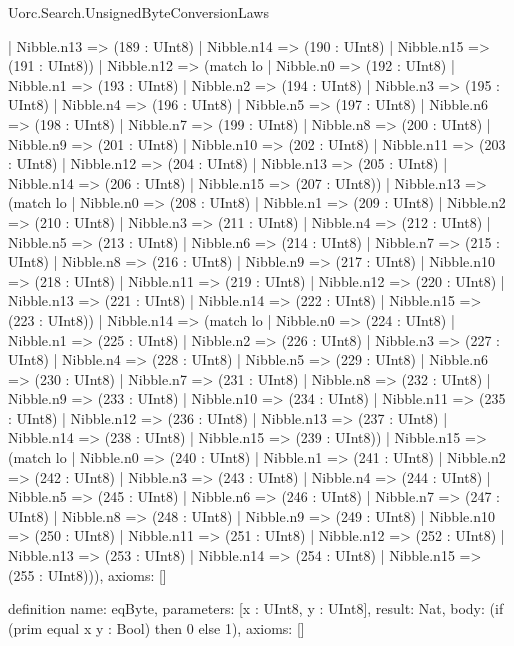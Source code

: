 \begin{lexlean}{Uorc.Search.UnsignedByteConversionLaws}
\begin{semanticmodule}
{      | Nibble.n13 => (189 : UInt8)
      | Nibble.n14 => (190 : UInt8)
      | Nibble.n15 => (191 : UInt8))
    | Nibble.n12 => (match lo
      | Nibble.n0 => (192 : UInt8)
      | Nibble.n1 => (193 : UInt8)
      | Nibble.n2 => (194 : UInt8)
      | Nibble.n3 => (195 : UInt8)
      | Nibble.n4 => (196 : UInt8)
      | Nibble.n5 => (197 : UInt8)
      | Nibble.n6 => (198 : UInt8)
      | Nibble.n7 => (199 : UInt8)
      | Nibble.n8 => (200 : UInt8)
      | Nibble.n9 => (201 : UInt8)
      | Nibble.n10 => (202 : UInt8)
      | Nibble.n11 => (203 : UInt8)
      | Nibble.n12 => (204 : UInt8)
      | Nibble.n13 => (205 : UInt8)
      | Nibble.n14 => (206 : UInt8)
      | Nibble.n15 => (207 : UInt8))
    | Nibble.n13 => (match lo
      | Nibble.n0 => (208 : UInt8)
      | Nibble.n1 => (209 : UInt8)
      | Nibble.n2 => (210 : UInt8)
      | Nibble.n3 => (211 : UInt8)
      | Nibble.n4 => (212 : UInt8)
      | Nibble.n5 => (213 : UInt8)
      | Nibble.n6 => (214 : UInt8)
      | Nibble.n7 => (215 : UInt8)
      | Nibble.n8 => (216 : UInt8)
      | Nibble.n9 => (217 : UInt8)
      | Nibble.n10 => (218 : UInt8)
      | Nibble.n11 => (219 : UInt8)
      | Nibble.n12 => (220 : UInt8)
      | Nibble.n13 => (221 : UInt8)
      | Nibble.n14 => (222 : UInt8)
      | Nibble.n15 => (223 : UInt8))
    | Nibble.n14 => (match lo
      | Nibble.n0 => (224 : UInt8)
      | Nibble.n1 => (225 : UInt8)
      | Nibble.n2 => (226 : UInt8)
      | Nibble.n3 => (227 : UInt8)
      | Nibble.n4 => (228 : UInt8)
      | Nibble.n5 => (229 : UInt8)
      | Nibble.n6 => (230 : UInt8)
      | Nibble.n7 => (231 : UInt8)
      | Nibble.n8 => (232 : UInt8)
      | Nibble.n9 => (233 : UInt8)
      | Nibble.n10 => (234 : UInt8)
      | Nibble.n11 => (235 : UInt8)
      | Nibble.n12 => (236 : UInt8)
      | Nibble.n13 => (237 : UInt8)
      | Nibble.n14 => (238 : UInt8)
      | Nibble.n15 => (239 : UInt8))
    | Nibble.n15 => (match lo
      | Nibble.n0 => (240 : UInt8)
      | Nibble.n1 => (241 : UInt8)
      | Nibble.n2 => (242 : UInt8)
      | Nibble.n3 => (243 : UInt8)
      | Nibble.n4 => (244 : UInt8)
      | Nibble.n5 => (245 : UInt8)
      | Nibble.n6 => (246 : UInt8)
      | Nibble.n7 => (247 : UInt8)
      | Nibble.n8 => (248 : UInt8)
      | Nibble.n9 => (249 : UInt8)
      | Nibble.n10 => (250 : UInt8)
      | Nibble.n11 => (251 : UInt8)
      | Nibble.n12 => (252 : UInt8)
      | Nibble.n13 => (253 : UInt8)
      | Nibble.n14 => (254 : UInt8)
      | Nibble.n15 => (255 : UInt8))),
  axioms: []
}

definition{
  name: eqByte,
  parameters: [x : UInt8, y : UInt8],
  result: Nat,
  body: (if (prim equal x y : Bool) then 0 else 1),
  axioms: []
}


\end{semanticmodule}
\end{lexlean}
